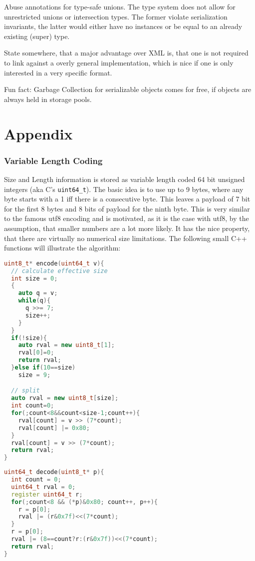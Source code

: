 \documentclass[a4paper,10pt]{article}
\begin{document}
Abuse annotations for type-safe unions. The type system does not allow for unrestricted unions or intersection types. The former violate serialization invariants, the latter would either have no instances or be equal to an already existing (super) type.

State somewhere, that a major advantage over XML is, that one is not required to link against a overly general implementation, which is nice if one is only interested in a very specific format.

Fun fact: Garbage Collection for serializable objects comes for free, if objects are always held in storage pools.

\newpage
\todos

\part{Appendix}
\renewcommand\thesection{\Alph{section}}
\setcounter{section}{0}
\section{Variable Length Coding}

Size and Length information is stored as variable length coded 64 bit unsigned integers (aka C's \texttt{uint64\_t}). The basic idea is to use up to 9 bytes, where any byte starts with a 1 iff there is a consecutive byte. This leaves a payload of 7 bit for the first 8 bytes and 8 bits of payload for the ninth byte. This is very similar to the famous utf8 encoding and is motivated, as it is the case with utf8, by the assumption, that smaller numbers are a lot more likely. It has the nice property, that there are virtually no numerical size limitations.
The following small C++ functions will illustrate the algorithm:
\begin{lstlisting}[label=v64enc,caption=Variable Length Encoding,language=C++]
uint8_t* encode(uint64_t v){
  // calculate effective size
  int size = 0;
  {
    auto q = v;
    while(q){
      q >>= 7;
      size++;
    }
  }
  if(!size){
    auto rval = new uint8_t[1];
    rval[0]=0;
    return rval;
  }else if(10==size)
    size = 9;

  // split
  auto rval = new uint8_t[size];
  int count=0;
  for(;count<8&&count<size-1;count++){
    rval[count] = v >> (7*count);
    rval[count] |= 0x80;
  }
  rval[count] = v >> (7*count);
  return rval;
}
\end{lstlisting}
\begin{lstlisting}[label=v64dec,caption=Variable Length Decoding,language=C++]
uint64_t decode(uint8_t* p){
  int count = 0;
  uint64_t rval = 0;
  register uint64_t r;
  for(;count<8 && (*p)&0x80; count++, p++){
    r = p[0];
    rval |= (r&0x7f)<<(7*count);
  }
  r = p[0];
  rval |= (8==count?r:(r&0x7f))<<(7*count);
  return rval;
}
\end{lstlisting}
\end{document}
